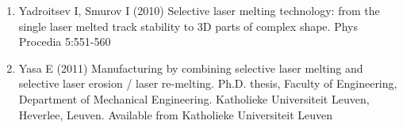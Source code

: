 \documentclass[10pt]{article}
\begin{document}
\begin{enumerate}
  \item Yadroitsev I, Smurov I (2010) Selective laser melting technology: from the single laser melted track stability to 3D parts of complex shape. Phys Procedia 5:551-560

  \item Yasa E (2011) Manufacturing by combining selective laser melting and selective laser erosion / laser re-melting. Ph.D. thesis, Faculty of Engineering, Department of Mechanical Engineering. Katholieke Universiteit Leuven, Heverlee, Leuven. Available from Katholieke Universiteit Leuven

\end{enumerate}
\end{document}
